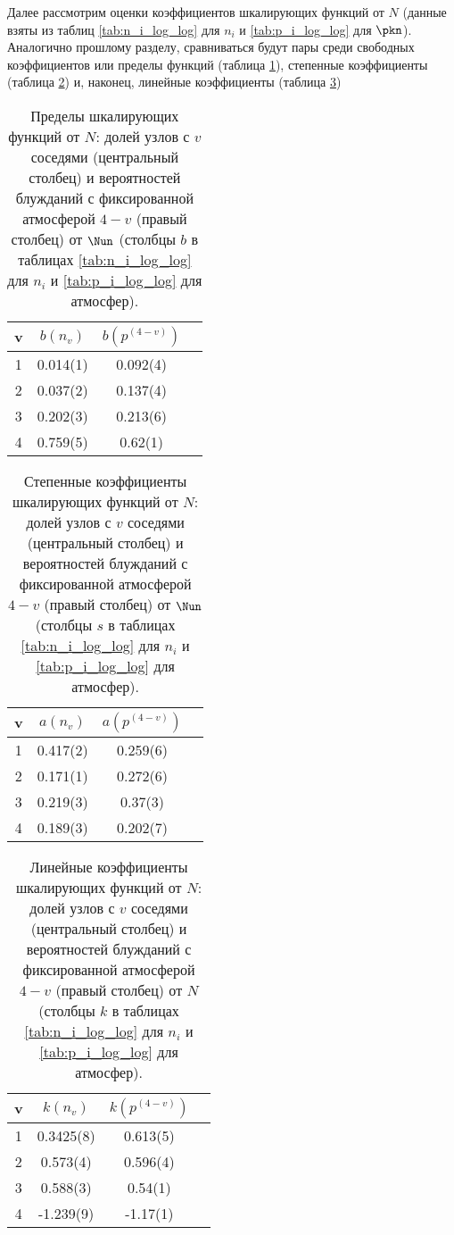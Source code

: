 Далее рассмотрим оценки коэффициентов шкалирующих функций от $N$ (данные взяты из таблиц \ref{tab:n_i_log_log} для $n_i$ и \ref{tab:p_i_log_log} для $\pkn$). Аналогично прошлому разделу, сравниваться будут пары среди свободных коэффициентов или пределы функций (таблица \ref{tab:n_vs_atm_b}), степенные коэффициенты (таблица \ref{tab:n_vs_atm_a}) и, наконец, линейные коэффициенты (таблица \ref{tab:n_vs_atm_k})

\begin{table}[h]
\centering
\begin{tabular}{|c|c|c|c|}
\hline
v & $b(n_v)$ & $b(p^{(4-v)})$ \\ \hline
1 & 0.014(1) & 0.092(4) \\ \hline
2 & 0.037(2) & 0.137(4) \\ \hline
3 & 0.202(3) & 0.213(6) \\ \hline
4 & 0.759(5) & 0.62(1) \\ \hline
\end{tabular}
\caption{Пределы шкалирующих функций от $N$: долей узлов с $v$ соседями (центральный столбец) и вероятностей блужданий с фиксированной атмосферой $4-v$ (правый столбец) от $\Nun$ (столбцы $b$ в таблицах \ref{tab:n_i_log_log} для $n_i$ и \ref{tab:p_i_log_log} для атмосфер).}
\label{tab:n_vs_atm_b}
\end{table}

\begin{table}[h]
\centering
\begin{tabular}{|c|c|c|c|}
\hline
v & $a(n_v)$ & $a(p^{(4-v)})$ \\ \hline
1 & 0.417(2) & 0.259(6) \\ \hline
2 & 0.171(1) & 0.272(6) \\ \hline
3 & 0.219(3) & 0.37(3) \\ \hline
4 & 0.189(3) & 0.202(7) \\ \hline
\end{tabular}
\caption{Степенные коэффициенты шкалирующих функций от $N$: долей узлов с $v$ соседями (центральный столбец) и вероятностей блужданий с фиксированной атмосферой $4-v$ (правый столбец) от $\Nun$ (столбцы $s$ в таблицах \ref{tab:n_i_log_log} для $n_i$ и \ref{tab:p_i_log_log} для атмосфер).}
\label{tab:n_vs_atm_a}
\end{table}

\begin{table}[h]
\centering
\begin{tabular}{|c|c|c|c|}
\hline
v & $k(n_v)$ & $k(p^{(4-v)})$ \\ \hline
1 & 0.3425(8) & 0.613(5) \\ \hline
2 & 0.573(4) & 0.596(4) \\ \hline
3 & 0.588(3) & 0.54(1) \\ \hline
4 & -1.239(9) & -1.17(1) \\ \hline
\end{tabular}
\caption{Линейные коэффициенты шкалирующих функций от $N$: долей узлов с $v$ соседями (центральный столбец) и вероятностей блужданий с фиксированной атмосферой $4-v$ (правый столбец) от $N$ (столбцы $k$ в таблицах \ref{tab:n_i_log_log} для $n_i$ и \ref{tab:p_i_log_log} для атмосфер).}
\label{tab:n_vs_atm_k}
\end{table}

